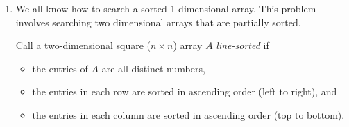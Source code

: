 \documentclass[11pt]{article}
\theoremstyle{definition}
\newtheorem*{solution}{Solution}
\newtheorem*{algorithm}{Algorithm}
\newtheorem*{proofoc}{Proof of correctness}
\begin{document}
\begin{enumerate}
The goal is to 
create a divide and conquer algorithm that 
finds any interchange $k$ that is a local minimum while examining relatively few 
of the $c(i)$ values.
Although there may be many local minimums, your algorithm need only find one of them.
\begin{enumerate}
\newpage
\item (2 points) First, prove that a local minimum exists.
\begin{solution}
\end{solution}
\newpage
\item (3 points) Clearly describe a divide and conquer algorithm for the problem
\begin{algorithm}
\end{algorithm}
\newpage
\item (3 points) Prove that your algorithm is correct
\begin{proofoc}
\end{proofoc}
\newpage
\item (2 points) Analyze the (worst case) number of interchange costs (i.e.~$c(i)$ values) examined by your algorithm
as a function of $n$.
\begin{solution}
\end{solution}
\newpage
\end{enumerate}

\emph{I have read and agree to the collaboration policy.}  -- FirstName LastName, email@ucsc.edu
\\
Collaborators: %
\\
\hrule
\item 
We all know how to search a sorted 1-dimensional array. 
This problem involves searching two dimensional arrays that are partially sorted.

Call a two-dimensional square ($n\times n$) array $A$ \emph{line-sorted} if 
\begin{itemize}
\item the entries of $A$ are all distinct numbers,
\item the entries in each row are sorted in ascending order (left to right), and 
\item the entries in each column are sorted in ascending order (top to bottom).
\end{itemize}


\end{enumerate}
\end{document}
